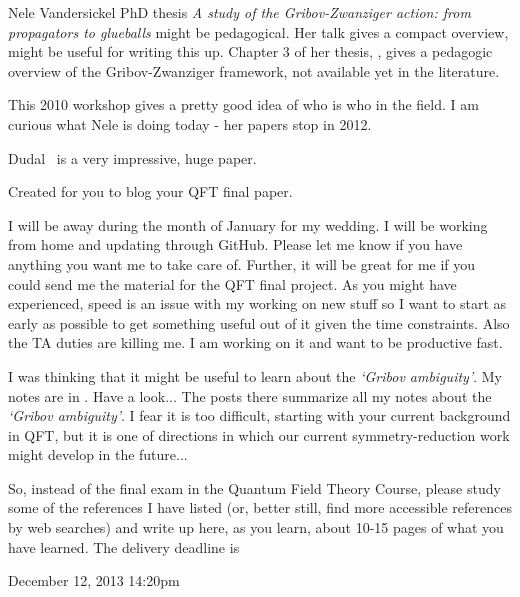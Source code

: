 \begin{description}
Nele Vandersickel PhD thesis {\em A study of the
Gribov-Zwanziger action: from propagators to glueballs} might be
pedagogical. Her
{talk} gives a compact overview, might be useful for writing this up.
Chapter 3 of her thesis, , gives a
pedagogic overview of the Gribov-Zwanziger framework, not available yet
in the literature.

This 2010  {workshop}
gives a pretty good idea of who is who in the field. I am curious what
Nele is doing today - 
{her papers} stop in 2012.

Dudal~\etal{} is a very impressive, huge paper.

\item[2013-11-25  Predrag to Kamal] Created  for
    you to blog your QFT final paper.

\item[2013-10-12  Kamal] I will be away during the month of January
    for my wedding. I will be working from home and updating through
    GitHub. Please let me know if you have anything you want me to
    take care of. Further, it will be great for me if you could send
    me the material for the QFT final project. As you might have
    experienced, speed is an issue with my working on new stuff so I
    want to start as early as possible to get something useful out of
    it given the time constraints. Also the TA duties are killing me.
    I am working on it and want to be productive fast.

\item[2013-10-17 Predrag to Kamal] I was thinking that it might be
    useful to learn about the \emph{`Gribov ambiguity'}. My notes are
    in . Have a look... The posts there summarize
    all my notes about the \emph{`Gribov ambiguity'}. I fear it is
    too difficult, starting with your current background in QFT, but
    it is one of directions in which our current symmetry-reduction
    work might develop in the future...

So, instead of the final exam in the Quantum Field Theory Course,
please study some of the references I have listed (or, better still,
find more accessible references by web searches) and write up here,
as you learn, about 10-15 pages of what you have learned. The
delivery deadline is

\begin{center}
{\large December 12, 2013 14:20pm}
\end{center}



\end{description}
\renewcommand{\ssp}{a}
